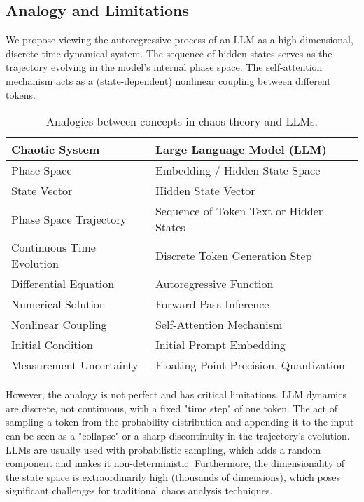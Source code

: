\documentclass[a4paper,12pt]{article}
\begin{document}
\subsection{Analogy and Limitations}
We propose viewing the autoregressive process of an LLM as a high-dimensional, discrete-time dynamical system. The sequence of hidden states serves as the trajectory evolving in the model's internal phase space. The self-attention mechanism acts as a (state-dependent) nonlinear coupling between different tokens. 

\begin{table}[H]
\centering
\begin{tabular}{@{}ll@{}}
\toprule
\textbf{Chaotic System} & \textbf{Large Language Model (LLM)} \\ \midrule
Phase Space & Embedding / Hidden State Space \\
State Vector & Hidden State Vector \\
Phase Space Trajectory & Sequence of Token Text or Hidden States \\
Continuous Time Evolution & Discrete Token Generation Step \\
Differential Equation & Autoregressive Function \\
Numerical Solution & Forward Pass Inference \\
Nonlinear Coupling & Self-Attention Mechanism \\
Initial Condition & Initial Prompt Embedding \\
Measurement Uncertainty & Floating Point Precision, Quantization \\ \bottomrule
\end{tabular}
\caption{Analogies between concepts in chaos theory and LLMs.}
\label{tab:analogy}
\end{table}


However, the analogy is not perfect and has critical limitations. LLM dynamics are discrete, not continuous, with a fixed "time step" of one token. The act of sampling a token from the probability distribution and appending it to the input can be seen as a "collapse" or a sharp discontinuity in the trajectory's evolution. 
LLMs are usually used with probabilistic sampling, which adds a random component and makes it non-deterministic. Furthermore, the dimensionality of the state space is extraordinarily high (thousands of dimensions), which poses significant challenges for traditional chaos analysis techniques.
\end{document}
